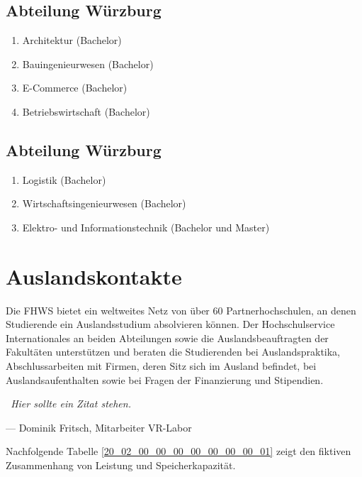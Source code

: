 \vskip 10mm

\subsection{Abteilung Würzburg}
\label{22_01_01_00_00_00_00_00_00_00}

\begin{enumerate}
\item Architektur (Bachelor)
\item Bauingenieurwesen (Bachelor)
\item E-Commerce (Bachelor)
\item Betriebswirtschaft (Bachelor)
\end{enumerate}


\vskip 10mm


\subsection{Abteilung Würzburg}
\label{22_01_02_00_00_00_00_00_00_00}

\begin{enumerate}
\item Logistik (Bachelor)
\item Wirtschaftsingenieurwesen (Bachelor)
\item Elektro- und Informationstechnik (Bachelor und Master)
\end{enumerate}


\vskip 10mm


\section{Auslandskontakte}
\label{22_02_00_00_00_00_00_00_00_00}
Die FHWS bietet ein weltweites Netz von über 60 Partnerhochschulen, an denen Studierende ein Auslandsstudium absolvieren können. Der Hochschulservice Internationales an beiden Abteilungen sowie die Auslandsbeauftragten der Fakultäten unterstützen und beraten die Studierenden bei Auslandspraktika, Abschlussarbeiten mit Firmen, deren Sitz sich im Ausland befindet, bei Auslandsaufenthalten sowie bei Fragen der Finanzierung und Stipendien.


\vskip 3mm
	\epigraph
	{
		\centering\itshape\frq~Hier sollte ein Zitat stehen.~\flq	
	}
	{
		\vskip 3mm
		--- Dominik Fritsch, Mitarbeiter VR-Labor
	}
\vskip 3mm

Nachfolgende Tabelle \ref{20_02_00_00_00_00_00_00_00_01} zeigt den fiktiven Zusammenhang von Leistung und Speicherkapazität.  

